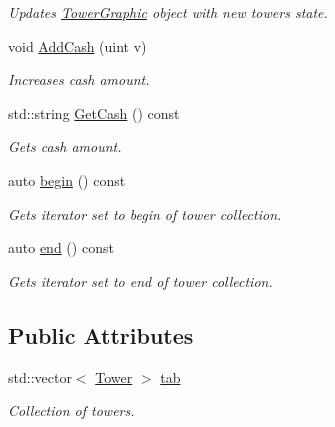 \begin{DoxyCompactItemize}
\begin{DoxyCompactList}\small\item\em Updates \mbox{\hyperlink{class_tower_graphic}{Tower\+Graphic}} object with new towers state. \end{DoxyCompactList}\item 
void \mbox{\hyperlink{class_tower_manager_a67c7741801ff0935ea2b0a6181768532}{Add\+Cash}} (uint v)
\begin{DoxyCompactList}\small\item\em Increases cash amount. \end{DoxyCompactList}\item 
std\+::string \mbox{\hyperlink{class_tower_manager_ae449833a3d381d3d616c35b1489ecd55}{Get\+Cash}} () const
\begin{DoxyCompactList}\small\item\em Gets cash amount. \end{DoxyCompactList}\item 
auto \mbox{\hyperlink{class_tower_manager_a90d1ce46145a7b52d50308ab29de5616}{begin}} () const
\begin{DoxyCompactList}\small\item\em Gets iterator set to begin of tower collection. \end{DoxyCompactList}\item 
auto \mbox{\hyperlink{class_tower_manager_a66cb83ad5d16ae63806b65d34768645e}{end}} () const
\begin{DoxyCompactList}\small\item\em Gets iterator set to end of tower collection. \end{DoxyCompactList}\end{DoxyCompactItemize}
\subsection*{Public Attributes}
\begin{DoxyCompactItemize}
\item 
\mbox{\label{class_tower_manager_ac3b672da8534f42c9981df3fd55a9fbe}} 
std\+::vector$<$ \mbox{\hyperlink{class_tower}{Tower}} $>$ \mbox{\hyperlink{class_tower_manager_ac3b672da8534f42c9981df3fd55a9fbe}{tab}}
\begin{DoxyCompactList}\small\item\em Collection of towers. \end{DoxyCompactList}\end{DoxyCompactItemize}


